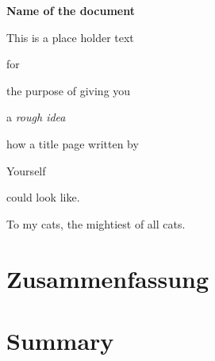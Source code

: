 \thispagestyle{empty}

\begin{center}
\vspace*{1in}

{\Large  \textbf{Name of the document}}
\par\vspace*{2cm}
This is a place holder text\par
for\par
the purpose of giving you\par
a \textit{rough idea}\par
how a title page written by \par\vspace*{1cm}
{\large Yourself}\par
could look like.\par\vspace*{2cm}

\end{center}

\cleardoublepage
\thispagestyle{empty}

%
%

\begin{dedication}

To my cats, the mightiest of all cats.

\end{dedication}

\restoregeometry	%

%
%

\cleardoublepage
\tableofcontents

\cleardoublepage
\listoffigures

\cleardoublepage
\listoftables

%
%

\cleardoublepage
\chapter{Zusammenfassung}

\thispagestyle{empty}

\chapter{Summary}

\thispagestyle{empty}
